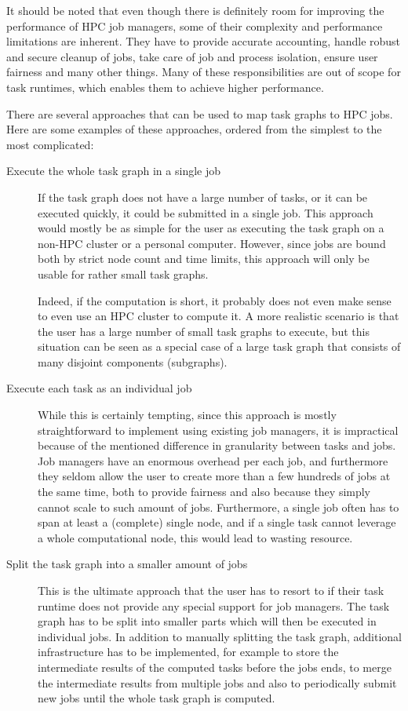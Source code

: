 It should be noted that even though there is definitely room for improving the performance of
HPC job managers, some of their complexity and performance limitations are inherent. They have
to provide accurate accounting, handle robust and secure cleanup of jobs, take care of job and
process isolation, ensure user fairness and many other things. Many of these responsibilities are
out of scope for task runtimes, which enables them to achieve higher performance.

There are several approaches that can be used to map task graphs to HPC jobs.
Here are some examples of these approaches, ordered from the simplest to the most complicated:

\begin{description}
    \item[Execute the whole task graph in a single job] If the task graph does not have a large
    number of tasks, or it can be executed quickly, it could be submitted in a single job. This
    approach would mostly be as simple for the user as executing the task graph on a non-HPC
    cluster or a personal computer. However, since jobs are bound both by strict node count and
    time limits, this approach will only be usable for rather small task graphs.

    Indeed, if the computation is short, it probably does not even make sense to even use an HPC
    cluster to compute it. A more realistic scenario is that the user has a large number of
    small task graphs to execute, but this situation can be seen as a special case of a large task
    graph that consists of many disjoint components (subgraphs).
    \item[Execute each task as an individual job] While this is certainly tempting, since this
    approach is mostly straightforward to implement using existing job managers, it is
    impractical because of the mentioned difference in granularity between tasks and jobs.
    Job managers have an enormous overhead per each job, and furthermore they seldom allow the
    user to create more than a few hundreds of jobs at the same time, both to provide fairness and
    also because they simply cannot scale to such amount of jobs. Furthermore, a single job
    often has to span at least a (complete) single node, and if a single task cannot leverage a
    whole computational node, this would lead to wasting resource.
    \item[Split the task graph into a smaller amount of jobs] This is the ultimate approach that
    the
    user has to resort to if their task runtime does not provide any special support for job
    managers. The task graph has to be split into smaller parts which will then be executed in
    individual jobs. In addition to manually splitting the task graph, additional infrastructure
    has to be implemented, for example to store the intermediate results of the computed tasks
    before the jobs ends, to merge the intermediate results from multiple jobs and also to
    periodically submit new jobs until the whole task graph is computed.


\end{description}
